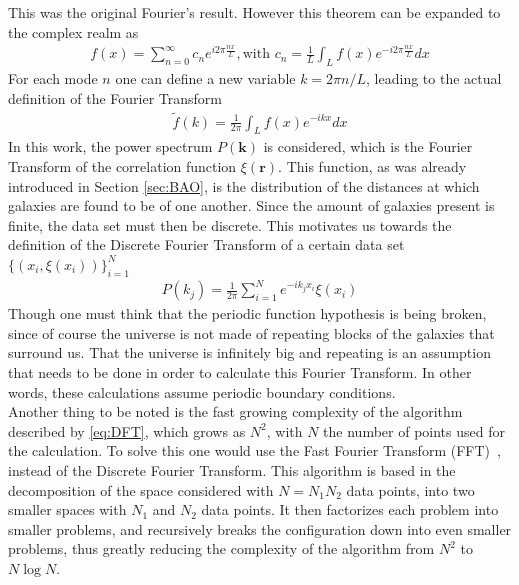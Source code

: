 This was the original Fourier's result. However this theorem can be expanded to the complex realm as 
\begin{align}
	f(x) = \sum_{n=0}^{\infty} c_n e^{i 2\pi \frac{nx}{L}}, \text{with } c_n = \frac{1}{L}\int_{L}^{} f(x) e^{-i 2\pi \frac{nx}{L}}dx 
\end{align}
For each mode $n$ one can define a new variable $k=2\pi n /L$, leading to the actual definition of the Fourier Transform 
\begin{align}
	\tilde{f}(k) = \frac{1}{2\pi}\int_{L}^{}  f(x) e^{-i k x} dx
\end{align}
In this work, the power spectrum $P(\textbf{k})$ is considered, which is the Fourier Transform of the correlation function $\xi(\textbf{r})$. This function, as was already introduced in Section \ref{sec:BAO}, is the distribution of the distances at which galaxies are found to be of one another. Since the amount of galaxies present is finite, the data set must then be discrete. This motivates us towards the definition of the Discrete Fourier Transform of a certain data set $\{\left( x_i, \xi(x_i) \right) \}_{i=1}^{N} $
\begin{align}
	P(k_j) = \frac{1}{2\pi}\sum_{i=1}^{N} e^{-i k_j x_{i}} \xi(x_i)
	\label{eq:DFT}
\end{align}
Though one must think that the periodic function hypothesis is being broken, since of course the universe is not made of repeating blocks of the galaxies that surround us.  That the universe is infinitely big and repeating is an assumption that needs to be done in order to calculate this Fourier Transform. In other words, these calculations assume periodic boundary conditions.\\


Another thing to be noted is the fast growing complexity of the algorithm described by \eqref{eq:DFT}, which grows as $N^2$, with $N$ the number of points used for the calculation. 
To solve this one would use the Fast Fourier Transform (FFT)~\cite{FFT}, instead of the Discrete Fourier Transform. This algorithm is based in the decomposition of the space considered with $N=N_1N_2$ data points, into two smaller spaces with $N_1$ and $N_2$ data points. It then factorizes each problem into smaller problems, and recursively breaks the configuration down into even smaller problems, thus greatly reducing the complexity of the algorithm from $N^2$ to $N\log N$.  \\

